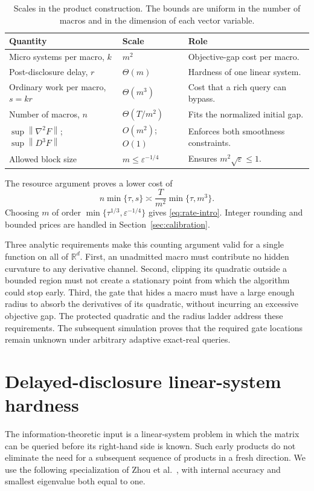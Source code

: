 \documentclass[11pt]{article}
\theoremstyle{definition}
\theoremstyle{remark}
\newcommand{\R}{\mathbb R}
\newcommand{\eps}{\varepsilon}
\newcommand{\norm}[1]{\left\|#1\right\|}
\begin{document}
\begin{table}[h]
\centering
\small
\renewcommand{\arraystretch}{1.18}
\caption{Scales in the product construction. The bounds are uniform in
the number of macros and in the dimension of each vector variable.}
\label{tab:scales}
\begin{tabularx}{\textwidth}{@{}p{}p{}Y@{}}
\toprule
Quantity & Scale & Role\\
\midrule
Micro systems per macro, $k$ & $m^2$ & Objective-gap cost per macro.\\
Post-disclosure delay, $r$ & $\Theta(m)$ & Hardness of one linear system.\\
Ordinary work per macro, $s=kr$ & $\Theta(m^3)$ & Cost that a rich query can bypass.\\
Number of macros, $n$ & $\Theta(T/m^2)$ & Fits the normalized initial gap.\\
$\sup\norm{\nabla^2F}$; $\sup\norm{D^3F}$ & $O(m^2)$; $O(1)$ & Enforces both smoothness constraints.\\
Allowed block size & $m\le\eps^{-1/4}$ & Ensures $m^2\sqrt\eps\le1$.\\
\bottomrule
\end{tabularx}
\end{table}

The resource argument proves a lower cost of
\begin{equation}\label{eq:overview-cost}
 n\min\{\tau,s\}
 \asymp
 \frac{T}{m^2}\min\{\tau,m^3\}.
\end{equation}
Choosing $m$ of order
$\min\{\tau^{1/3},\eps^{-1/4}\}$ gives \eqref{eq:rate-intro}.
Integer rounding and bounded prices are handled in
Section~\ref{sec:calibration}.

Three analytic requirements make this counting argument valid for a
single function on all of $\R^d$. First, an unadmitted macro must
contribute no hidden curvature to any derivative channel. Second,
clipping its quadratic outside a bounded region must not create a
stationary point from which the algorithm could stop early. Third, the
gate that hides a macro must have a large enough radius to absorb the
derivatives of its quadratic, without incurring an excessive objective
gap. The protected quadratic and the radius ladder address these
requirements. The subsequent simulation proves that the required gate
locations remain unknown under arbitrary adaptive exact-real queries.

\section{Delayed-disclosure linear-system hardness}\label{sec:input}
The information-theoretic input is a linear-system problem in which
the matrix can be queried before its right-hand side is known.
Such early products do not eliminate the need for a subsequent sequence
of products in a fresh direction. We use the following specialization of
Zhou et al.\ \cite[Lemma 6.9]{zhou}, with internal accuracy and smallest
eigenvalue both equal to one.
\end{document}
